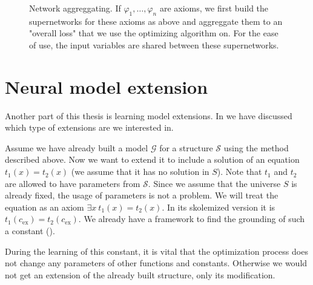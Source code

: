 \begin{figure}
\caption{Network aggreggating. If $\varphi_1,\dots,\varphi_n$ are axioms, we first build the supernetworks for these axioms as above and aggreggate them to an "overall loss" that we use the optimizing algorithm on. For the ease of use, the input variables are shared between these supernetworks.}
\label{diagram_aggregating}
\centering
\end{figure}

\section{Neural model extension}
Another part of this thesis is learning model extensions. In  we have discussed which type of extensions are we interested in.

Assume we have already built a model $\mathcal{G}$ for a structure $\mathcal{S}$ using the method described above. Now we want to extend it to include a solution of an equation $t_1(x)=t_2(x)$ (we assume that it has no solution in $S$). Note that $t_1$ and $t_2$ are allowed to have parameters from $\mathcal{S}$. Since we assume that the universe $S$ is already fixed, the usage of parameters is not a problem. We will treat the equation as an axiom $\exists x\ t_1(x)=t_2(x)$. In its skolemized version it is $t_1(c_{\text{ex}})= t_2(c_{\text{ex}})$. We already have a framework to find the grounding of such a constant ().

During the learning of this constant, it is vital that the optimization process does not change any parameters of other functions and constants. Otherwise we would not get an  extension of the already built structure, only its modification.


